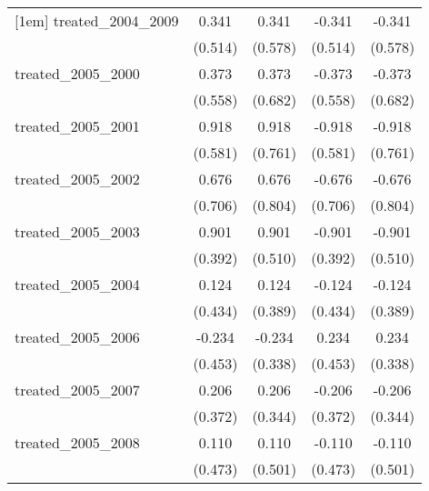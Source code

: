 {\begin{tabular}{l*{4}{c}}
[1em]
treated\_2004\_2009&       0.341         &       0.341         &      -0.341         &      -0.341         \\
            &     (0.514)         &     (0.578)         &     (0.514)         &     (0.578)         \\
[1em]
treated\_2005\_2000&       0.373         &       0.373         &      -0.373         &      -0.373         \\
            &     (0.558)         &     (0.682)         &     (0.558)         &     (0.682)         \\
[1em]
treated\_2005\_2001&       0.918         &       0.918         &      -0.918         &      -0.918         \\
            &     (0.581)         &     (0.761)         &     (0.581)         &     (0.761)         \\
[1em]
treated\_2005\_2002&       0.676         &       0.676         &      -0.676         &      -0.676         \\
            &     (0.706)         &     (0.804)         &     (0.706)         &     (0.804)         \\
[1em]
treated\_2005\_2003&       0.901\sym{*}  &       0.901         &      -0.901\sym{*}  &      -0.901         \\
            &     (0.392)         &     (0.510)         &     (0.392)         &     (0.510)         \\
[1em]
treated\_2005\_2004&       0.124         &       0.124         &      -0.124         &      -0.124         \\
            &     (0.434)         &     (0.389)         &     (0.434)         &     (0.389)         \\
[1em]
treated\_2005\_2006&      -0.234         &      -0.234         &       0.234         &       0.234         \\
            &     (0.453)         &     (0.338)         &     (0.453)         &     (0.338)         \\
[1em]
treated\_2005\_2007&       0.206         &       0.206         &      -0.206         &      -0.206         \\
            &     (0.372)         &     (0.344)         &     (0.372)         &     (0.344)         \\
[1em]
treated\_2005\_2008&       0.110         &       0.110         &      -0.110         &      -0.110         \\
            &     (0.473)         &     (0.501)         &     (0.473)         &     (0.501)         \\

\end{tabular}}
